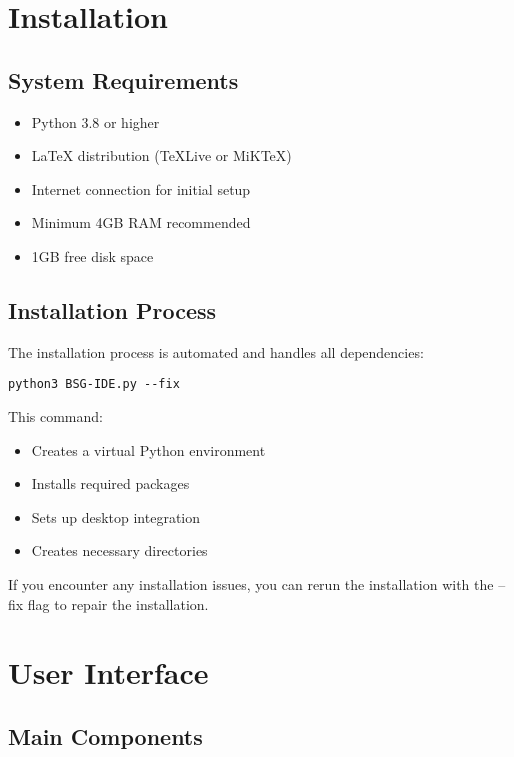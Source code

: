 \documentclass[11pt,a4paper]{article}
\begin{document}
\section{Installation}

\subsection{System Requirements}
\begin{itemize}
    \item Python 3.8 or higher
    \item LaTeX distribution (TeXLive or MiKTeX)
    \item Internet connection for initial setup
    \item Minimum 4GB RAM recommended
    \item 1GB free disk space
\end{itemize}

\subsection{Installation Process}
The installation process is automated and handles all dependencies:

\begin{lstlisting}[caption=Installation Command]
python3 BSG-IDE.py --fix
\end{lstlisting}

This command:
\begin{itemize}
    \item Creates a virtual Python environment
    \item Installs required packages
    \item Sets up desktop integration
    \item Creates necessary directories
\end{itemize}

\begin{tcolorbox}[title=Note]
If you encounter any installation issues, you can rerun the installation with the --fix flag to repair the installation.
\end{tcolorbox}

\section{User Interface}

\subsection{Main Components}
\end{document}
